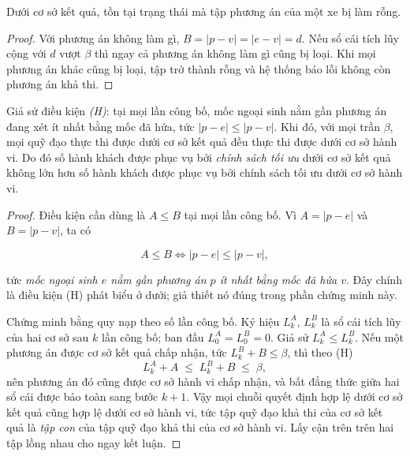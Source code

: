 \begin{dinhly}
Dưới cơ sở kết quả, tồn tại trạng thái mà tập phương án của một xe bị làm rỗng.
\end{dinhly}

\begin{proof}
Với phương án không làm gì, $B = |p - v| = |e - v| = d$. Nếu sổ cái tích lũy cộng với $d$ vượt
$\beta$ thì ngay cả phương án không làm gì cũng bị loại. Khi mọi phương án khác cũng bị loại,
tập trở thành rỗng và hệ thống báo lỗi không còn phương án khả thi.
\end{proof}

\begin{dinhly}
\label{dl:tapcon}
Giả sử điều kiện \emph{(H)}: tại mọi lần công bố, mốc ngoại sinh nằm gần phương án đang xét ít
nhất bằng mốc đã hứa, tức $|p - e| \le |p - v|$. Khi đó, với mọi trần $\beta$, mọi quỹ đạo thực
thi được dưới cơ sở kết quả đều thực thi được dưới cơ sở hành vi. Do đó số hành khách được phục
vụ bởi \emph{chính sách tối ưu} dưới cơ sở kết quả không lớn hơn số hành khách được phục vụ bởi
chính sách tối ưu dưới cơ sở hành vi.
\end{dinhly}

\begin{proof}
Điều kiện cần dùng là $A \le B$ tại mọi lần công bố. Vì $A = |p-e|$ và $B = |p-v|$, ta có

\begin{equation}
A \le B \iff |p - e| \le |p - v|,
\label{eq:dieukien}
\end{equation}

tức \emph{mốc ngoại sinh $e$ nằm gần phương án $p$ ít nhất bằng mốc đã hứa $v$}. Đây chính là
điều kiện (H) phát biểu ở dưới; giả thiết nó đúng trong phần chứng minh này.

Chứng minh bằng quy nạp theo số lần công bố. Ký hiệu $L^{A}_k$, $L^{B}_k$ là sổ cái tích lũy
của hai cơ sở sau $k$ lần công bố; ban đầu $L^{A}_0 = L^{B}_0 = 0$. Giả sử $L^{A}_k \le L^{B}_k$.
Nếu một phương án được cơ sở kết quả chấp nhận, tức $L^{B}_k + B \le \beta$, thì theo (H)
$$L^{A}_k + A \;\le\; L^{B}_k + B \;\le\; \beta,$$
nên phương án đó cũng được cơ sở hành vi chấp nhận, và bất đẳng thức giữa hai sổ cái được bảo
toàn sang bước $k+1$. Vậy mọi chuỗi quyết định hợp lệ dưới cơ sở kết quả cũng hợp lệ dưới cơ sở
hành vi, tức tập quỹ đạo khả thi của cơ sở kết quả là \emph{tập con} của tập quỹ đạo khả thi của
cơ sở hành vi. Lấy cận trên trên hai tập lồng nhau cho ngay kết luận.
\end{proof}

